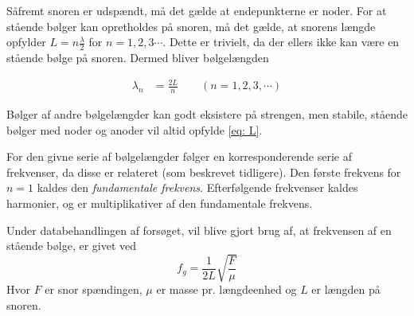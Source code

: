 \documentclass[A2_main.tex]{subfiles}
\begin{document}
Såfremt snoren er udspændt, må det gælde at endepunkterne er noder. For at stående bølger kan opretholdes på snoren, må det gælde, at snorens længde opfylder $L=n\frac{\lambda}{2}$ for $n=1,2,3\cdots$. Dette er trivielt, da der ellers ikke kan være en stående bølge på snoren. Dermed bliver bølgelængden

\begin{align}
    \lambda_n &= \frac{2L}{n} \qquad (n=1,2,3,\cdots)
    \label{eq: L}
\end{align}

Bølger af andre bølgelængder kan godt eksistere på strengen, men stabile, stående bølger med noder og anoder vil altid opfylde \cref{eq: L}.

For den givne serie af bølgelængder følger en korresponderende serie af frekvenser, da disse er relateret (som beskrevet tidligere). Den første frekvens for $n=1$ kaldes den \emph{fundamentale frekvens}. Efterfølgende frekvenser kaldes harmonier, og er multiplikativer af den fundamentale frekvens.

Under databehandlingen af forsøget, vil blive gjort brug af, at frekvensen af en stående bølge, er givet ved
\begin{equation}
 f_g = \frac{1}{2L}\sqrt{\frac{F}{\mu}}
 \label{eq: swave}
\end{equation}
Hvor $F$ er snor spændingen, $\mu$ er masse pr. længdeenhed og $L$ er længden på snoren.
\end{document}
